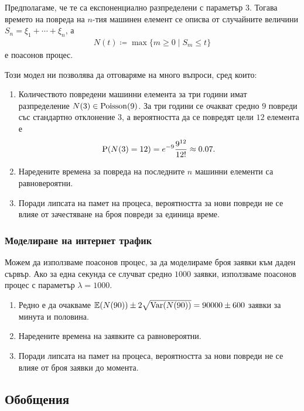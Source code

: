 \documentclass[numbers=endperiod, bibliography=totocnumbered]{scrartcl}
\begin{document}
Предполагаме, че те са експоненциално разпределени с параметър \( 3 \). Тогава времето на повреда на \( n \)-тия машинен елемент се описва от случайните величини \( S_n = \xi_1 + \cdots + \xi_n \), а
\begin{align*}
  N(t) \coloneqq \max \{ m \geq 0 \mid S_m \leq t \}
\end{align*}
е поасонов процес.

Този модел ни позволява да отговаряме на много въпроси, сред които:
\begin{enumerate}
  \item Количеството повредени машинни елемента за три години имат разпределение \( N(3) \in \operatorname{Poisson}(9) \). За три години се очакват средно \( 9 \) повреди със стандартно отклонение \( 3 \), а вероятността да се повредят цели \( 12 \) елемента е
  \begin{align*}
    \operatorname{P}(N(3) = 12) = e^{-9} \frac {9^{12}} {12!} \approx 0.07.
  \end{align*}

  \item Наредените времена за повреда на последните \( n \) машинни елементи са равновероятни.
  \item Поради липсата на памет на процеса, вероятността за нови повреди не се влияе от зачестяване на броя повреди за единица време.
\end{enumerate}

\subsubsection{Моделиране на интернет трафик}

Можем да използваме поасонов процес, за да моделираме броя заявки към даден сървър. Ако за една секунда се случват средно \( 1000 \) заявки, използваме поасонов процес с параметър \( \lambda = 1000 \).
\begin{enumerate}
  \item Редно е да очакваме \( \mathbb{E}(N(90)) \pm 2\sqrt{\operatorname{Var}(N(90))} = 90000 \pm 600 \) заявки за минута и половина.
  \item Наредените времена на заявките са равновероятни.
  \item Поради липсата на памет на процеса, вероятността за нови повреди не се влияе от броя заявки до момента.
\end{enumerate}

\subsection{Обобщения}
\end{document}
